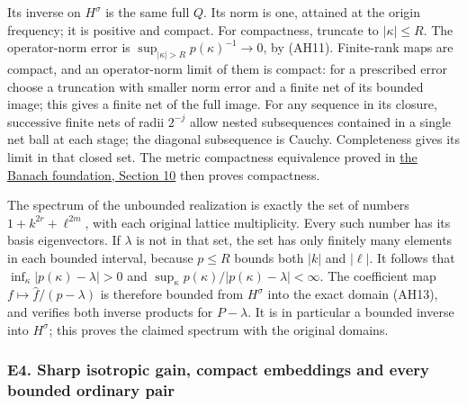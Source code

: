 \documentclass[
  11pt,
]{article}
\begin{document}
Its inverse on \(H^\sigma\) is the same full \(Q\). Its norm is one,
attained at the origin frequency; it is positive and compact. For
compactness, truncate to \(|\kappa|\leq R\). The operator-norm error is
\(\sup_{|\kappa|>R}p(\kappa)^{-1}\to0\), by (AH11). Finite-rank maps are
compact, and an operator-norm limit of them is compact: for a prescribed
error choose a truncation with smaller norm error and a finite net of
its bounded image; this gives a finite net of the full image. For any
sequence in its closure, successive finite nets of radii \(2^{-j}\)
allow nested subsequences contained in a single net ball at each stage;
the diagonal subsequence is Cauchy. Completeness gives its limit in that
closed set. The metric compactness equivalence proved in
\href{banach-foundation-bridges.pdf\#section*.23}{the
Banach foundation, Section 10} then proves compactness.

The spectrum of the unbounded realization is exactly the set of numbers
\(1+k^{2r}+\ell^{2m}\), with each original lattice multiplicity. Every
such number has its basis eigenvectors. If \(\lambda\) is not in that
set, the set has only finitely many elements in each bounded interval,
because \(p\leq R\) bounds both \(|k|\) and \(|\ell|\). It follows that
\(\inf_\kappa|p(\kappa)-\lambda|>0\) and
\(\sup_\kappa p(\kappa)/|p(\kappa)-\lambda|<\infty\). The coefficient
map \(f\mapsto\widehat f/(p-\lambda)\) is therefore bounded from
\(H^\sigma\) into the exact domain (AH13), and verifies both inverse
products for \(P-\lambda\). It is in particular a bounded inverse into
\(H^\sigma\); this proves the claimed spectrum with the original
domains.

\subsubsection{E4. Sharp isotropic gain, compact embeddings and every
bounded ordinary
pair}\label{e4.-sharp-isotropic-gain-compact-embeddings-and-every-bounded-ordinary-pair}
\end{document}
